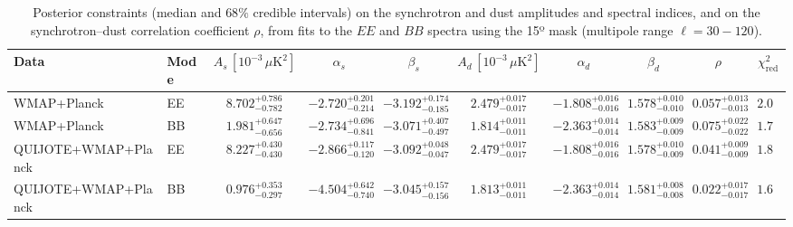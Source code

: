 \begin{table}[h]
\centering
\scriptsize
\setlength{\tabcolsep}{4pt}
\caption{Posterior constraints (median and $68\%$ credible intervals) on the synchrotron and dust amplitudes and spectral indices, and on the synchrotron--dust correlation coefficient $\rho$, from fits to the $EE$ and $BB$ spectra using the 15º mask (multipole range $\ell=30-120$).}
\label{tab:fit_results}
\begin{tabular}{llcccccccc}
\toprule
Data & Mode & $A_s\,[10^{-3}\,\mu\mathrm{K}^2]$ & $\alpha_s$ & $\beta_s$ & $A_d\,[10^{-3}\,\mu\mathrm{K}^2]$ & $\alpha_d$ & $\beta_d$ & $\rho$ & $\chi^2_\mathrm{red}$ \\
\midrule
WMAP+Planck & EE & $8.702^{+0.786}_{-0.782}$ & $-2.720^{+0.201}_{-0.214}$ & $-3.192^{+0.174}_{-0.185}$ & $2.479^{+0.017}_{-0.017}$ & $-1.808^{+0.016}_{-0.016}$ & $1.578^{+0.010}_{-0.010}$ & $0.057^{+0.013}_{-0.013}$ & $2.03$ \\
WMAP+Planck & BB & $1.981^{+0.647}_{-0.656}$ & $-2.734^{+0.696}_{-0.841}$ & $-3.071^{+0.407}_{-0.497}$ & $1.814^{+0.011}_{-0.011}$ & $-2.363^{+0.014}_{-0.014}$ & $1.583^{+0.009}_{-0.009}$ & $0.075^{+0.022}_{-0.022}$ & $1.74$ \\
QUIJOTE+WMAP+Planck & EE & $8.227^{+0.430}_{-0.430}$ & $-2.866^{+0.117}_{-0.120}$ & $-3.092^{+0.048}_{-0.047}$ & $2.479^{+0.017}_{-0.017}$ & $-1.808^{+0.016}_{-0.016}$ & $1.578^{+0.010}_{-0.009}$ & $0.041^{+0.009}_{-0.009}$ & $1.81$ \\
QUIJOTE+WMAP+Planck & BB & $0.976^{+0.353}_{-0.297}$ & $-4.504^{+0.642}_{-0.740}$ & $-3.045^{+0.157}_{-0.156}$ & $1.813^{+0.011}_{-0.011}$ & $-2.363^{+0.014}_{-0.014}$ & $1.581^{+0.008}_{-0.008}$ & $0.022^{+0.017}_{-0.017}$ & $1.66$ \\
\bottomrule
\end{tabular}
\end{table}
